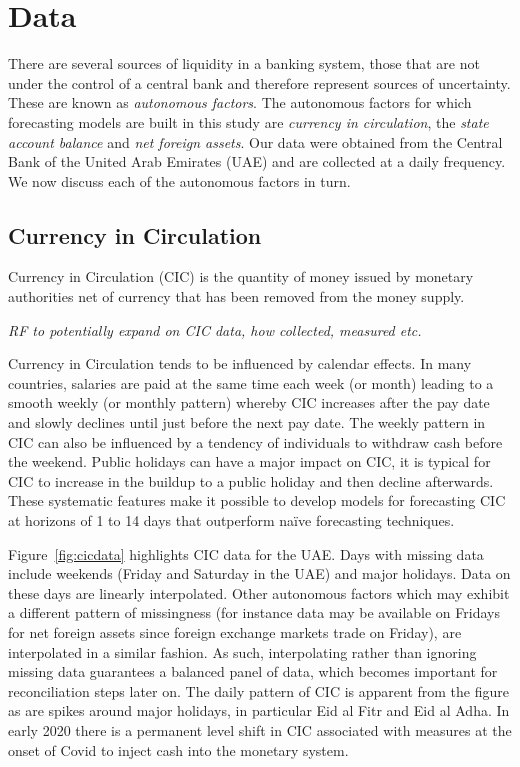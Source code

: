 \section{Data}
\label{sec:data}

There are several sources of liquidity in a banking system, those that are not
under  the control  of  a  central bank  and  therefore  represent sources  of
uncertainty. These  are known as \textit{autonomous  factors}.  The autonomous
factors  for   which  forecasting   models  are  built   in  this   study  are
\textit{currency  in  circulation},  the \textit{state  account  balance}  and
\textit{net foreign assets}.  Our data were  obtained from the Central Bank of
the United Arab Emirates (UAE) and are  collected at a daily frequency. We now
discuss each of the autonomous factors in turn.

\subsection{Currency in Circulation}

Currency in  Circulation (CIC)  is the  quantity of  money issued  by monetary
authorities net of currency that has been removed from the money supply.

\textit{\color{blue}  RF to  potentially expand  on CIC  data, how  collected,
measured etc.}

Currency in Circulation  tends to be influenced by calendar  effects.  In many
countries, salaries are paid at the same  time each week (or month) leading to
a smooth weekly (or monthly pattern)  whereby CIC increases after the pay date
and slowly declines until just before the next pay date. The weekly pattern in
CIC  can also  be influenced  by a  tendency of  individuals to  withdraw cash
before the  weekend. Public  holidays can have  a major impact  on CIC,  it is
typical  for CIC  to increase  in the  buildup to  a public  holiday and  then
decline  afterwards. These  systematic features  make it  possible to  develop
models for forecasting CIC at horizons of 1 to 14 days that outperform na\"ive
forecasting techniques.

Figure~\ref{fig:cicdata} highlights  CIC data for  the UAE. Days  with missing
data include  weekends (Friday and  Saturday in  the UAE) and  major holidays.
Data on these  days are linearly interpolated. Other  autonomous factors which
may  exhibit a  different pattern  of missingness  (for instance  data may  be
available on  Fridays for  net foreign assets  since foreign  exchange markets
trade  on  Friday),   are  interpolated  in  a  similar   fashion.   As  such,
interpolating rather than ignoring missing data guarantees a balanced panel of
data, which  becomes important for  reconciliation steps later on.   The daily
pattern  of  CIC is  apparent  from  the figure  as  are  spikes around  major
holidays, in particular Eid al Fitr and Eid  al Adha. In early 2020 there is a
permanent level shift in CIC associated with measures at the onset of Covid to
inject cash into the monetary system.

